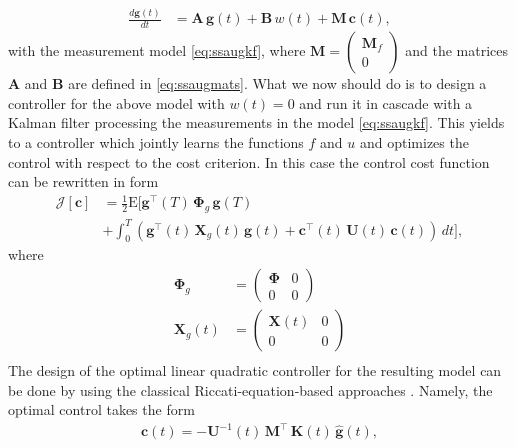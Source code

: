 \documentclass[journal]{IEEEtran}
\begin{document}
\begin{equation}
\begin{split}
  \frac{d\mathbf{g}(t)}{dt}
  &= \mathbf{A} \, \mathbf{g}(t)
  + \mathbf{B} \, w(t) + \mathbf{M} \, \mathbf{c}(t),
\end{split}
\end{equation}
%
with the measurement model \eqref{eq:ssaugkf}, where $ \mathbf{M} = \begin{pmatrix} \mathbf{M}_f \\ 0 \end{pmatrix}$ and the matrices $\mathbf{A}$ and $\mathbf{B}$ are defined in \eqref{eq:ssaugmats}. What we now should do is to design a controller for the above model with $w(t) = 0$ and run it in cascade with a Kalman filter processing the measurements in the model \eqref{eq:ssaugkf}. This yields to a controller which jointly learns the functions $f$ and $u$ and optimizes the control with respect to the cost criterion. In this case the control cost function can be rewritten in form
%
\begin{equation}
\begin{split}
  \mathcal{J}[\mathbf{c}] &= \frac{1}{2} \mathrm{E} \Big[
    \mathbf{g}^{\top}(T) \, \boldsymbol{\Phi}_g \, \mathbf{g}(T) \\
   &+ \int_0^T
   (\mathbf{g}^{\top}(t) \, \mathbf{X}_g(t) \, \mathbf{g}(t)
  + \mathbf{c}^{\top}(t) \, \mathbf{U}(t) \, \mathbf{c}(t)) \, dt \Big],
\end{split}
\end{equation}
%
where
%
\begin{equation}
\begin{split}
 \boldsymbol{\Phi}_g &= \begin{pmatrix}
   \boldsymbol{\Phi} & 0 \\ 0 & 0
 \end{pmatrix} \\
 \mathbf{X}_g(t) &= \begin{pmatrix}
   \mathbf{X}(t) & 0 \\ 0 & 0
 \end{pmatrix} \\
\end{split}
\end{equation}
%
The design of the optimal linear quadratic controller for the resulting model can be done by using the classical Riccati-equation-based approaches \cite{Kalman:1960b,Anderson+Moore:2007}. Namely, the optimal control takes the form
%
\begin{equation}
\begin{split}
  \mathbf{c}(t) = -\mathbf{U}^{-1}(t) \, \mathbf{M}^{\top} \, \mathbf{K}(t) \, \hat{\mathbf{g}}(t),
\end{split}
\label{eq:joint_control1} 
\end{equation}
\end{document}
